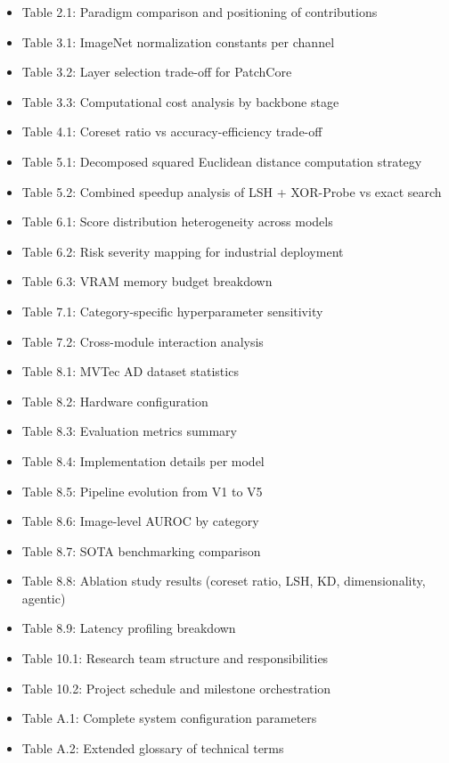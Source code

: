 \documentclass[12pt, a4paper, oneside]{report}
\begin{document}
\begin{itemize}
\item
  Table 2.1: Paradigm comparison and positioning of contributions
\item
  Table 3.1: ImageNet normalization constants per channel
\item
  Table 3.2: Layer selection trade-off for PatchCore
\item
  Table 3.3: Computational cost analysis by backbone stage
\item
  Table 4.1: Coreset ratio vs accuracy-efficiency trade-off
\item
  Table 5.1: Decomposed squared Euclidean distance computation strategy
\item
  Table 5.2: Combined speedup analysis of LSH + XOR-Probe vs exact search
\item
  Table 6.1: Score distribution heterogeneity across models
\item
  Table 6.2: Risk severity mapping for industrial deployment
\item
  Table 6.3: VRAM memory budget breakdown
\item
  Table 7.1: Category-specific hyperparameter sensitivity
\item
  Table 7.2: Cross-module interaction analysis
\item
  Table 8.1: MVTec AD dataset statistics
\item
  Table 8.2: Hardware configuration
\item
  Table 8.3: Evaluation metrics summary
\item
  Table 8.4: Implementation details per model
\item
  Table 8.5: Pipeline evolution from V1 to V5
\item
  Table 8.6: Image-level AUROC by category
\item
  Table 8.7: SOTA benchmarking comparison
\item
  Table 8.8: Ablation study results (coreset ratio, LSH, KD, dimensionality, agentic)
\item
  Table 8.9: Latency profiling breakdown
\item
  Table 10.1: Research team structure and responsibilities
\item
  Table 10.2: Project schedule and milestone orchestration
\item
  Table A.1: Complete system configuration parameters
\item
  Table A.2: Extended glossary of technical terms
\end{itemize}
\end{document}
